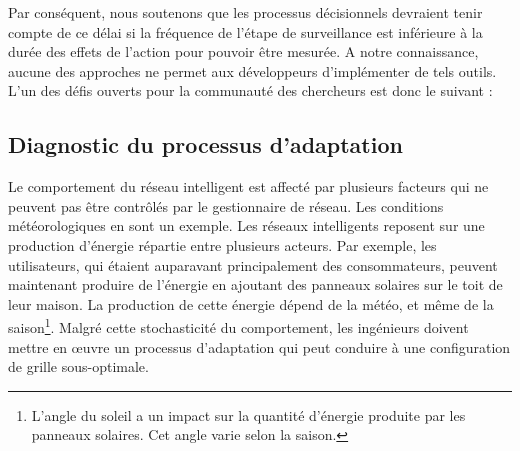 Par conséquent, nous soutenons que les processus décisionnels devraient tenir compte de ce délai si la fréquence de l'étape de surveillance est inférieure à la durée des effets de l'action pour pouvoir être mesurée. 
A notre connaissance, aucune des approches ne permet aux développeurs d'implémenter de tels outils. 
L'un des défis ouverts pour la communauté des chercheurs est donc le suivant :
\vspace{-2em}

\subsection{Diagnostic du processus d'adaptation}
\label{sec:french:challenges:diagnosis}

%
Le comportement du réseau intelligent est affecté par plusieurs facteurs qui ne peuvent pas être contrôlés par le gestionnaire de réseau. 
Les conditions météorologiques en sont un exemple. Les réseaux intelligents reposent sur une production d'énergie répartie entre plusieurs acteurs. 
Par exemple, les utilisateurs, qui étaient auparavant principalement des consommateurs, peuvent maintenant produire de l'énergie en ajoutant des panneaux solaires sur le toit de leur maison. 
La production de cette énergie dépend de la météo, et même de la saison\footnote{L'angle du soleil a un impact sur la quantité d'énergie produite par les panneaux solaires. Cet angle varie selon la saison.}. 
Malgré cette stochasticité du comportement, les ingénieurs doivent mettre en œuvre un processus d'adaptation qui peut conduire à une configuration de grille sous-optimale.

